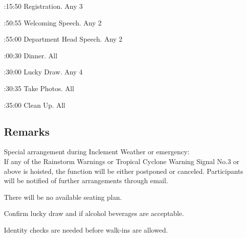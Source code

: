 \bTR{}:15:50
\eTD\bTD Registration.
\eTD\bTD Any 3
\eTD\eTR

\bTR{}:50:55
\eTD\bTD Welcoming Speech.
\eTD\bTD Any 2
\eTD\eTR

\bTR{}:55:00
\eTD\bTD Department Head Speech.
\eTD\bTD Any 2
\eTD\eTR

\bTR{}:00:30
\eTD\bTD Dinner.
\eTD\bTD All
\eTD\eTR

\bTR{}:30:00
\eTD\bTD Lucky Draw.
\eTD\bTD Any 4
\eTD\eTR

\bTR{}:30:35
\eTD\bTD Take Photos.
\eTD\bTD All
\eTD\eTR

\bTR{}:35:00
\eTD\bTD Clean Up.
\eTD\bTD All
\eTD\eTR

\eTABLEbody
\eTABLE

\subsection{Remarks}
\startitemize
\item Special arrangement during Inclement Weather or emergency: \\
If any of the Rainstorm Warnings or Tropical Cyclone Warning Signal No.3 or above is hoisted, the function will be either postponed or canceled. Participants will be notified of further arrangements through email.
\item There will be no available seating plan.
\item Confirm lucky draw and if alcohol beverages are acceptable.
\item Identity checks are needed before walk-ins are allowed.
\stopitemize

\pagebreak
